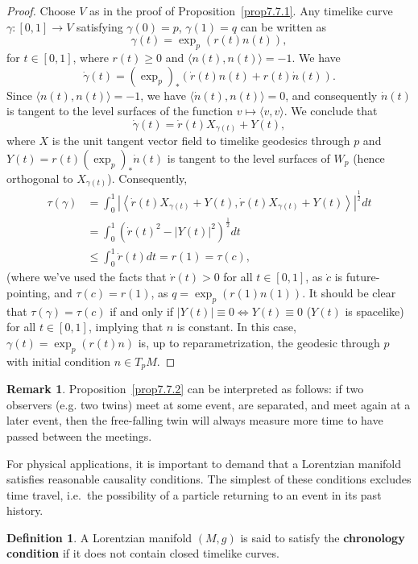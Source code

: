 \documentclass[12pt]{amsart}
\theoremstyle{definition}
\newtheorem{Def}[Thm]{Definition}
\newtheorem{Remark}[Thm]{Remark}
\theoremstyle{remark}
\begin{document}
\begin{proof}
Choose $V$ as in the proof of Proposition~\ref{prop7.7.1}. Any timelike curve $\gamma:[0,1] \to V$ satisfying $\gamma(0)=p$, $\gamma(1)=q$ can be written as
\[
\gamma(t)=\exp_p(r(t)n(t)),
\]
for $t \in [0,1]$, where $r(t) \geq 0$ and $\langle n(t), n(t) \rangle = -1$. We have
\[
\dot{\gamma}(t)=(\exp_p)_*\left(\dot{r}(t)n(t)+r(t)\dot{n}(t)\right).
\]
Since $\langle n(t), n(t) \rangle = -1$, we have $\langle \dot{n}(t), n(t) \rangle = 0$, and consequently $\dot{n}(t)$ is tangent to the level surfaces of the function $v \mapsto \langle v, v \rangle$. We conclude that
\[
\dot{\gamma}(t) = \dot{r}(t) X_{\gamma(t)} + Y(t),
\]
where $X$ is the unit tangent vector field to timelike geodesics through $p$ and $Y(t)=r(t)(\exp_p)_*\dot{n}(t)$ is tangent to the level surfaces of $W_p$ (hence orthogonal to $X_{\gamma(t)}$). Consequently,
\begin{align*}
\tau(\gamma) & = \int_0^1 \left|\left\langle \dot{r}(t) X_{\gamma(t)} + Y(t),\dot{r}(t) X_{\gamma(t)} + Y(t) \right\rangle\right|^\frac12 dt \\
& = \int_0^1 \left( \dot{r}(t)^2 - |Y(t)|^2 \right)^\frac12 dt \\
& \leq \int_0^1 \dot{r}(t) dt = r(1) = \tau(c),
\end{align*}
(where we've used the facts that $\dot{r}(t)> 0$ for all $t \in [0,1]$, as $\dot{c}$ is future-pointing, and $\tau(c)=r(1)$, as $q=\exp_p(r(1)n(1))$. It should be clear that $\tau(\gamma)=\tau(c)$ if and only if $|Y(t)|\equiv 0 \Leftrightarrow Y(t)\equiv 0$ ($Y(t)$ is spacelike) for all $t \in [0,1]$, implying that $n$ is constant. In this case, $\gamma(t)=\exp_p({r(t)n})$ is, up to reparametrization, the geodesic through $p$ with initial condition $n \in T_p M$.
\end{proof}

\begin{Remark}
Proposition~\ref{prop7.7.2} can be interpreted as follows: if two observers (e.g. two twins) meet at some event, are separated, and meet again at a later event, then the free-falling twin will always measure more time to have passed between the meetings.
\end{Remark}

For physical applications, it is important to demand that a Lorentzian manifold satisfies reasonable causality conditions. The simplest of these conditions excludes time travel, i.e.~the possibility of a particle returning to an event in its past history.

\begin{Def}
A Lorentzian manifold $(M,g)$ is said to satisfy the {\bf chronology condition} if it does not contain closed timelike curves.
\end{Def}
\end{document}
